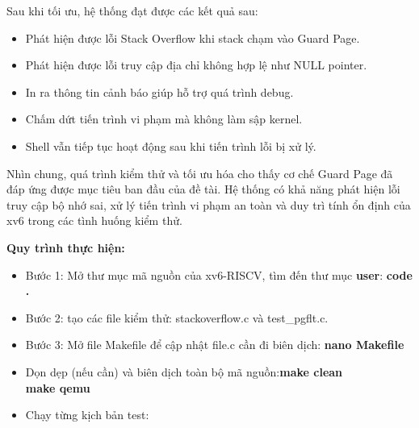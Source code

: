 Sau khi tối ưu, hệ thống đạt được các kết quả sau:

\begin{itemize}
    \item Phát hiện được lỗi Stack Overflow khi stack chạm vào Guard Page.
    \item Phát hiện được lỗi truy cập địa chỉ không hợp lệ như NULL pointer.
    \item In ra thông tin cảnh báo giúp hỗ trợ quá trình debug.
    \item Chấm dứt tiến trình vi phạm mà không làm sập kernel.
    \item Shell vẫn tiếp tục hoạt động sau khi tiến trình lỗi bị xử lý.
\end{itemize}

Nhìn chung, quá trình kiểm thử và tối ưu hóa cho thấy cơ chế Guard Page đã đáp ứng được mục tiêu ban đầu của đề tài. Hệ thống có khả năng phát hiện lỗi truy cập bộ nhớ sai, xử lý tiến trình vi phạm an toàn và duy trì tính ổn định của xv6 trong các tình huống kiểm thử.

\textbf{Quy trình thực hiện:}
\begin{itemize}
    \item Bước 1: Mở thư mục mã nguồn của xv6-RISCV, tìm đến thư mục \textbf{user}: \textbf{code .}
    \item Bước 2: tạo các file kiểm thử: stackoverflow.c và test\_pgflt.c.
   
    
    \item Bước 3: Mở file Makefile để cập nhật file.c cần đi biên dịch: \textbf{nano Makefile} 

    \item Dọn dẹp (nếu cần) và biên dịch toàn bộ mã nguồn:\textbf{make clean}\\ \textbf{make qemu}
    \item Chạy từng kịch bản test: 
   
   

\end{itemize}